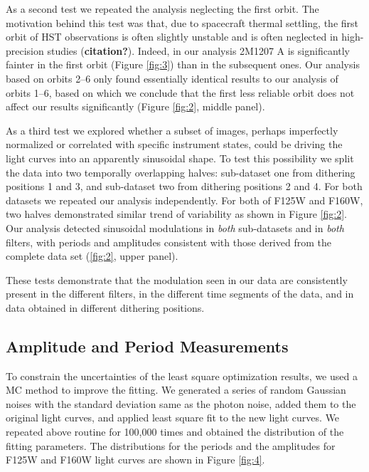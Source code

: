 \documentclass[apj]{emulateapj}
\begin{document}
 As a second test we repeated the analysis neglecting the first
 orbit. The motivation behind this test was that, due to spacecraft
 thermal settling, the first orbit of HST observations is often
 slightly unstable and is often neglected in high-precision studies
 (\textbf{citation?}). Indeed, in our analysis 2M1207 A is
 significantly fainter in the first orbit (Figure \ref{fig:3}) than in
 the subsequent ones.
 Our analysis based on orbits 2--6 only found essentially identical
 results to our analysis of orbits 1--6, based on which we conclude
 that the first less reliable orbit does not affect our results
 significantly (Figure \ref{fig:2}, middle panel).

As a third test we explored whether a subset of images, perhaps
imperfectly normalized or correlated with specific instrument states,
could be driving the light curves into an apparently sinusoidal
shape. To test this possibility we split the data into two temporally
overlapping halves: sub-dataset one from dithering positions 1 and 3,
and sub-dataset two from dithering positions 2 and 4. For both
datasets we repeated our analysis independently.  For both of F125W
and F160W, two halves demonstrated similar trend of variability as
shown in Figure \ref{fig:2}.  Our analysis detected sinusoidal
modulations in {\em both} sub-datasets and in {\em both} filters, with
periods and amplitudes consistent with those derived from the complete
data set (\ref{fig:2}, upper panel).
 
 These tests demonstrate that the modulation seen in our data are
 consistently present in the different filters, in the different time
 segments of the data, and in data obtained in different dithering
 positions.
 

\subsection{Amplitude and Period Measurements}

To constrain the uncertainties of the least square optimization
results, we used a MC method to improve the fitting. We
generated a series of random Gaussian noises with the standard deviation same as
the photon noise, added them to the original light curves, and applied
least square fit to the new light curves. We repeated above routine for 100,000 times and obtained
the distribution of the fitting parameters. The distributions for the
periods and the amplitudes for F125W and F160W light curves are
shown in Figure \ref{fig:4}.
\end{document}
